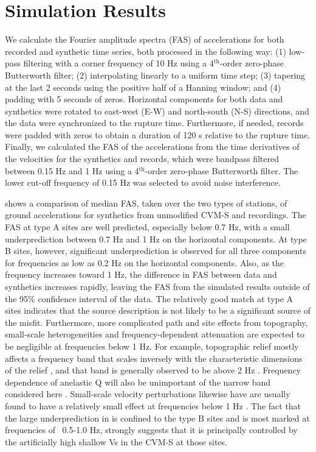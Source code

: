 \section{Simulation Results}
We calculate the Fourier amplitude spectra (FAS) of accelerations for both recorded and synthetic time series, both processed in the following way: (1) low-pass filtering with a corner frequency of 10 Hz using a 4$^{\text{th}}$-order zero-phase Butterworth filter; (2) interpolating linearly to a uniform time step; (3) tapering at the last 2 seconds using the positive half of a Hanning window; and (4) padding with 5 seconds of zeros. Horizontal components for both data and synthetics were rotated to east-west (E-W) and north-south (N-S) directions, and the data were synchronized to the rupture time. Furthermore, if needed, records were padded with zeros to obtain a duration of 120 s relative to the rupture time. Finally, we calculated the FAS of the accelerations from the time derivatives of the velocities for the synthetics and records, which were bandpass filtered between 0.15 Hz and 1 Hz using a 4$^{\text{th}}$-order zero-phase Butterworth filter. The lower cut-off frequency of 0.15 Hz was selected to avoid noise interference.

 shows a comparison of median FAS, taken over the two types of stations, of ground accelerations for synthetics from unmodified CVM-S and recordings. The FAS at type A sites are well predicted, especially below 0.7 Hz, with a small underprediction between 0.7 Hz and 1 Hz on the horizontal components. At type B sites, however, significant underprediction is observed for all three components for frequencies as low as 0.2 Hz on the horizontal components. Also, as the frequency increases toward 1 Hz, the difference in FAS between data and synthetics increases rapidly, leaving the FAS from the simulated results outside of the 95\% confidence interval of the data. The relatively good match at type A sites indicates that the source description is not likely to be a significant source of the misfit. Furthermore, more complicated path and site effects from topography, small-scale heterogeneities and frequency-dependent attenuation are expected to be negligible at frequencies below 1 Hz. For example, topographic relief mostly affects a frequency band that scales inversely with the characteristic dimensions of the relief , and that band is generally observed to be above 2 Hz . Frequency dependence of anelastic Q will also be unimportant of the narrow band considered here . Small-scale velocity perturbations likewise have are usually found to have a relatively small effect at frequencies below 1 Hz \citep{hartzellEffects3DRandom2010}. The fact that the large underprediction in  is confined to the type B sites and is most marked at frequencies of ~0.5-1.0 Hz, strongly suggests that it is principally controlled by the artificially high shallow Vs in the CVM-S at those sites.

